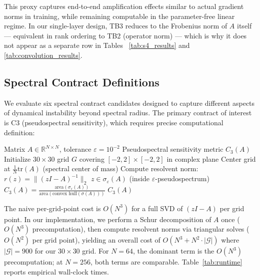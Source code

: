 \documentclass[twoside]{article}
\begin{document}
This proxy captures end-to-end amplification effects similar to actual gradient norms in training, while remaining computable in the parameter-free linear regime. In our single-layer design, TB3 reduces to the Frobenius norm of $A$ itself — equivalent in rank ordering to TB2 (operator norm) — which is why it does not appear as a separate row in Tables~
\ref{tab:s4_results} and~
\ref{tab:convolution_results}.

\subsection{Spectral Contract Definitions}

We evaluate six spectral contract candidates designed to capture different aspects of dynamical instability beyond spectral radius. The primary contract of interest is C3 (pseudospectral sensitivity), which requires precise computational definition:

\begin{algorithm}[h]
\caption{C3 - Pseudospectral Sensitivity Computation}
\begin{algorithmic}[1]
\REQUIRE Matrix $A \in \mathbb{R}^{N \times N}$, tolerance $\varepsilon = 10^{-2}$
\ENSURE Pseudospectral sensitivity metric $C_3(A)$
\STATE Initialize $30 \times 30$ grid $G$ covering $[-2, 2] \times [-2, 2]$ in complex plane
\STATE Center grid at $\frac{1}{N}\text{tr}(A)$ (spectral center of mass)
    \STATE Compute resolvent norm: $r(z) = \|(zI - A)^{-1}\|_2$
        \STATE $z \in \sigma_{\varepsilon}(A)$ (inside $\varepsilon$-pseudospectrum)
    \ENDIF
\ENDFOR
\STATE $C_3(A) = \frac{\text{area}(\sigma_{\varepsilon}(A))}{\text{area}(\text{convex hull}(\sigma(A)))}$
\RETURN $C_3(A)$
\end{algorithmic}
\end{algorithm}

The naive per-grid-point cost is $O(N^3)$ for a full SVD of $(zI - A)$ per grid point. In our implementation, we perform a Schur decomposition of $A$ once ($O(N^3)$ precomputation), then compute resolvent norms via triangular solves ($O(N^2)$ per grid point), yielding an overall cost of $O(N^3 + N^2 \cdot |\mathcal{G}|)$ where $|\mathcal{G}| = 900$ for our $30 \times 30$ grid. For $N = 64$, the dominant term is the $O(N^3)$ precomputation; at $N = 256$, both terms are comparable. Table~\ref{tab:runtime} reports empirical wall-clock times.
\end{document}
